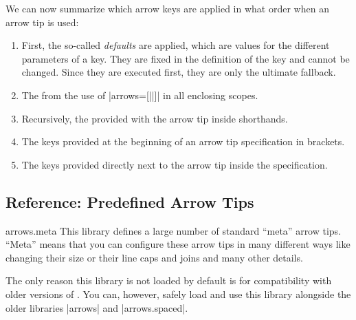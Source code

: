 We can now summarize which arrow keys are applied in what order when
an arrow tip is used:
\begin{enumerate}
\item First, the so-called \emph{defaults} are applied, which are
  values for the different parameters of a key. They are fixed in the
  definition of the key and cannot be changed. Since they are executed
  first, they are only the ultimate fallback.
\item The  from the use of |arrows=[||]| in all
  enclosing scopes.
\item Recursively, the  provided with the arrow
  tip inside shorthands.
\item The keys provided at the beginning of an arrow tip specification
  in brackets.
\item The keys provided directly next to the arrow tip inside the
  specification. 
\end{enumerate}




\subsection{Reference: Predefined Arrow Tips}

\begin{pgflibrary}{arrows.meta}
  This library defines a large number of standard ``meta'' arrow
  tips. ``Meta'' means that you can configure these arrow tips in many
  different ways like changing their size or their line caps and joins
  and many other details.

  The only reason this library is not loaded by default is for
  compatibility with older versions of \tikzname. You can, however,
  safely load and use this library alongside the older libraries
  |arrows| and |arrows.spaced|.
\end{pgflibrary}


